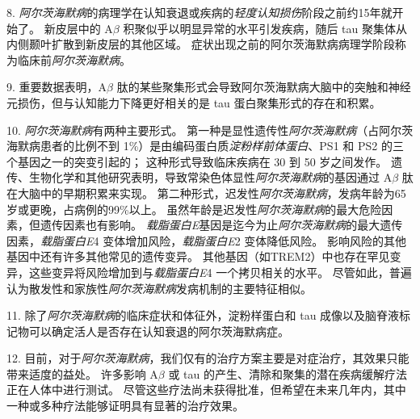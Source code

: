8. \textit{阿尔茨海默病}的病理学在认知衰退或疾病的\textit{轻度认知损伤}阶段之前约15年就开始了。
新皮层中的 A$\beta$ 积聚似乎以明显异常的水平引发疾病，随后 tau 聚集体从内侧颞叶扩散到新皮层的其他区域。
症状出现之前的阿尔茨海默病病理学阶段称为临床前\textit{阿尔茨海默病}。


9. 重要数据表明，A$\beta$ 肽的某些聚集形式会导致阿尔茨海默病大脑中的突触和神经元损伤，但与认知能力下降更好相关的是 tau 蛋白聚集形式的存在和积累。


10. \textit{阿尔茨海默病}有两种主要形式。
第一种是显性遗传性\textit{阿尔茨海默病}（占阿尔茨海默病患者的比例不到 1\%）是由编码蛋白质\textit{淀粉样前体蛋白}、PS1 和 PS2 的三个基因之一的突变引起的；
这种形式导致临床疾病在 30 到 50 岁之间发作。
遗传、生物化学和其他研究表明，导致常染色体显性\textit{阿尔茨海默病}的基因通过 A$\beta$ 肽在大脑中的早期积累来实现。
第二种形式，迟发性\textit{阿尔茨海默病}，发病年龄为65岁或更晚，占病例的99\%以上。
虽然年龄是迟发性\textit{阿尔茨海默病}的最大危险因素，但遗传因素也有影响。 \textit{载脂蛋白E}基因是迄今为止\textit{阿尔茨海默病}的最大遗传因素，\textit{载脂蛋白E}4 变体增加风险，\textit{载脂蛋白E}2 变体降低风险。
影响风险的其他基因中还有许多其他常见的遗传变异。
其他基因（如TREM2）中也存在罕见变异，这些变异将风险增加到与\textit{载脂蛋白E}4 一个拷贝相关的水平。
尽管如此，普遍认为散发性和家族性\textit{阿尔茨海默病}发病机制的主要特征相似。


11. 除了\textit{阿尔茨海默病}的临床症状和体征外，淀粉样蛋白和 tau 成像以及脑脊液标记物可以确定活人是否存在认知衰退的阿尔茨海默病症。


12. 目前，对于\textit{阿尔茨海默病}，我们仅有的治疗方案主要是对症治疗，其效果只能带来适度的益处。
许多影响 A$\beta$ 或 tau 的产生、清除和聚集的潜在疾病缓解疗法正在人体中进行测试。
尽管这些疗法尚未获得批准，但希望在未来几年内，其中一种或多种疗法能够证明具有显著的治疗效果。


